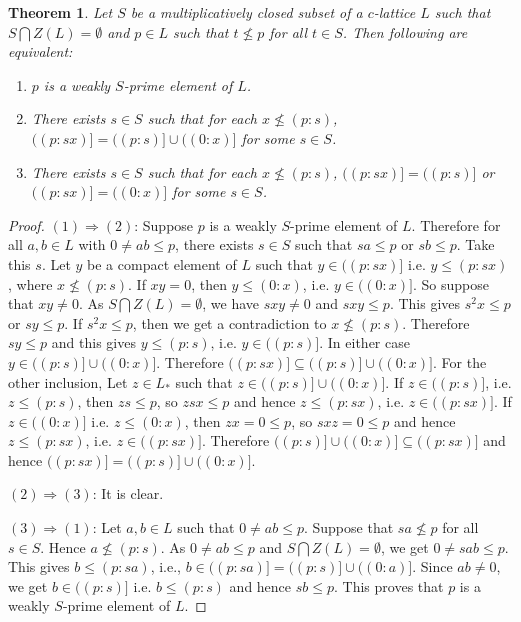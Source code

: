 \documentclass[10pt,twoside,a4paper]{amsart}
\numberwithin{equation}{section}
\theoremstyle{plain}
\newtheorem{thm}[lem]{Theorem}
\theoremstyle{definition}
\begin{document}
\begin{thm}%
	Let $S$ be a multiplicatively closed subset of a $c$-lattice $L$ such that $S\bigcap Z(L)=\emptyset$ and $p \in L$ such that $t \nleq p$ for all $t \in S$. Then following are equivalent:
	
	\begin{enumerate}
		\item $p$ is a weakly $S$-prime element of $L$.
		
		\item There exists $s \in S$ such that for each $x \nleq (p:s)$, $((p:sx)] = ((p:s)] \cup ((0:x)]$ for some $s \in S$.
		
		\item There exists $s \in S$ such that for each $x \nleq (p:s)$, $((p:sx)] = ((p:s)]$ or $((p:sx)] = ((0:x)]$ for some $s \in S$.
	\end{enumerate} 
\end{thm}
\begin{proof}
	$(1) \Rightarrow (2)$:  Suppose $p$ is a weakly $S$-prime element of $L$. Therefore for all $a,b \in L$ with $0 \neq ab \leq p$, there exists $s \in S$ such that $sa \leq p$   or $sb \leq p$. Take this $s$. Let $y$ be a compact element of $L$ such that $y  \in ((p:sx)]$ i.e. $y\leq (p:sx)$, where $x \nleq (p:s)$. If $xy =0$, then $y \leq (0:x)$, i.e. $y \in ((0:x)]$. So suppose that $xy \neq 0$. As $S\bigcap Z(L)=\emptyset$, we have $sxy \neq 0$ and $sxy \leq p$. This gives $s^2 x \leq p$ or  $sy \leq p$. If $s^2 x \leq p$, then we get a contradiction to $x \nleq (p:s)$. Therefore  $sy \leq p$ and this gives $y \leq (p:s)$, i.e. $y \in ((p:s)]$. In either case $y\in ((p:s)] \cup ((0:x) ]$. Therefore $((p:sx)] \subseteq ((p:s)] \cup ((0:x)]$. For the other inclusion, Let $z \in L_*$ such that $z \in ((p:s)] \cup ((0:x)]$. If $z \in ((p:s)] $, i.e. $z \leq (p:s)$, then $zs\leq p$, so $zsx\leq p$ and hence $z \leq (p:sx)$, i.e. $z \in ((p:sx)]$. If $z \in  ((0:x)]$ i.e. $z \leq  (0:x)$, then $zx =0 \leq p$, so $sxz =0 \leq p$ and hence $z \leq (p:sx)$, i.e. $z \in ((p:sx)]$. Therefore $((p:s)] \cup ((0:x)] \subseteq ((p:sx)]$ and hence $((p:sx)] = ((p:s)] \cup ((0:x)]$. 
	
	$(2) \Rightarrow (3)$: It is clear.
	
	$(3) \Rightarrow (1)$: Let $a,b \in L$ such that $0 \neq ab \leq p$. Suppose that $sa \nleq p$ for all $s \in S$. Hence $a \nleq (p:s)$. As $0 \neq ab \leq p$ and  $S\bigcap Z(L)=\emptyset$, we get $0 \neq sab \leq p$. This gives $b \leq (p:sa)$, i.e., $ b \in ((p:sa)] = ((p:s)] \cup ((0:a)]$. Since $ab \neq 0$, we get $b \in ((p:s)]$ i.e. $b \leq (p:s)$ and hence $sb \leq p$. This proves that $p$ is a weakly $S$-prime element of $L$. 
\end{proof}
\end{document}
